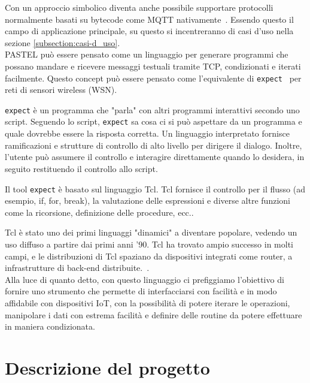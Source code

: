 \documentclass[10pt]{article}
\begin{document}
Con un approccio simbolico diventa anche possibile supportare protocolli normalmente basati su bytecode come MQTT nativamente~\cite{gaglio19interoperable}.
Essendo questo il campo di applicazione principale, su questo si incentreranno di casi d'uso nella sezione \ref{subsection:casi-d_uso}.\\



PASTEL può essere pensato come un linguaggio per generare programmi che possano mandare e ricevere messaggi testuali tramite TCP, condizionati e iterati facilmente. Questo concept può essere pensato come l'equivalente di \texttt{expect}~\cite{libes1991expect, libes1990expect, libes1995exploring} per reti di sensori wireless (WSN).

\texttt{expect} è un programma che "parla" con altri programmi interattivi secondo uno script. Seguendo lo script, \texttt{expect} sa cosa ci si può aspettare da un programma e quale dovrebbe essere la risposta corretta. Un linguaggio interpretato fornisce ramificazioni e strutture di controllo di alto livello per dirigere il dialogo. Inoltre, l'utente può assumere il controllo e interagire direttamente quando lo desidera, in seguito restituendo il controllo allo script.

Il tool \texttt{expect} è basato sul linguaggio Tcl. Tcl fornisce il controllo per il flusso (ad esempio, if, for, break), la valutazione delle espressioni e diverse altre funzioni come la ricorsione, definizione delle procedure, ecc.. 

Tcl è stato uno dei primi linguaggi "dinamici" a diventare popolare, vedendo un uso diffuso a partire dai primi anni '90. Tcl ha trovato ampio successo in molti campi, e le distribuzioni di Tcl spaziano da dispositivi integrati come router, a infrastrutture di back-end distribuite.~\cite{nadkarni2017tcl}.\\

Alla luce di quanto detto, con questo linguaggio ci prefiggiamo l'obiettivo di fornire uno strumento che permette di interfacciarsi con facilità e in modo affidabile con dispositivi IoT, con la possibilità di potere iterare le operazioni, manipolare i dati con estrema facilità e definire delle routine da potere effettuare in maniera condizionata.



\section{Descrizione del progetto}\label{section:descrizione}
\end{document}

